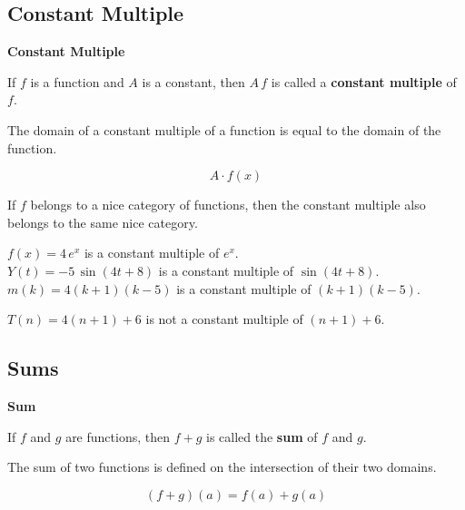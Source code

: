 \documentclass{ximera}
\begin{document}
\subsection*{Constant Multiple}


\begin{template}  \textbf{\textcolor{blue!55!black}{Constant Multiple}} 


If  $f$ is a function and $A$ is a constant, then $A \, f$ is called a \textbf{constant multiple} of $f$. 

The domain of a constant multiple of a function is equal to the domain of the function. 


\[ A \cdot f(x)  \]



\end{template}



\begin{observation}

If $f$ belongs to a nice category of functions, then the constant multiple also belongs to the same nice category.

\end{observation}




\begin{example}

$f(x) = 4 \, e^x$ is a constant multiple of $e^x$. \\
$Y(t) = -5 \, \sin(4t + 8)$ is a constant multiple of $\sin(4t + 8)$. \\
$m(k) = 4 (k+1)(k-5)$ is a constant multiple of $(k+1)(k-5)$. 


$T(n) = 4 (n+1) + 6$ is not a constant multiple of $(n+1) + 6$. 

\end{example}


















\subsection*{Sums}


\begin{template}  \textbf{\textcolor{blue!55!black}{Sum}} 


If  $f$ and $g$ are functions, then $f + g$ is called the \textbf{sum} of $f$ and $g$. 

The sum of two functions is defined on the intersection of their two domains. 


\[ (f + g)(a) = f(a) + g(a)  \]



\end{template}
\end{document}
